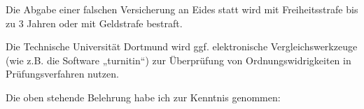 \noindent Die Abgabe einer falschen Versicherung an Eides statt wird mit Freiheitsstrafe bis zu 3 Jahren 
oder mit Geldstrafe bestraft.  

\noindent Die Technische Universität Dortmund wird ggf. elektronische Vergleichswerkzeuge (wie z.B. die 
Software „turnitin“) zur Überprüfung von Ordnungswidrigkeiten in Prüfungsverfahren nutzen. 

\noindent Die oben stehende Belehrung habe ich zur Kenntnis genommen: 
\vspace{\baselineskip}

\underline{\makebox[.4\textwidth][c]{\myLocation, \myDate}}
\hspace{.25\textwidth}
\underline{\hspace{.3\textwidth}}
\newline
{}
\hspace{.25\textwidth}
\makeatother